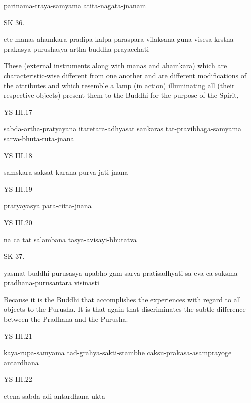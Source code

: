 parinama-traya-samyama atita-nagata-jnanam

SK 36.

ete manas ahamkara pradipa-kalpa paraspara vilaksana
guna-visesa krstna prakasya purushasya-artha buddha prayacchati

These (external instruments along with manas and ahamkara)
which are characteristic-wise different from one another
and are different modifications of the attributes
and which resemble a lamp (in action)
illuminating all (their respective objects)
present them to the Buddhi for the purpose of the Spirit,

YS III.17

sabda-artha-pratyayana itaretara-adhyasat sankaras
tat-pravibhaga-samyama sarva-bhuta-ruta-jnana

YS III.18

samskara-saksat-karana purva-jati-jnana

YS III.19

pratyayasya para-citta-jnana

YS III.20

na ca tat salambana tasya-avisayi-bhutatva

SK 37.

yasmat buddhi purusasya upabho-gam sarva pratisadhyati
sa eva ca suksma pradhana-purusantara visinasti

Because it is the Buddhi that accomplishes the experiences
with regard to all objects to the Purusha.
It is that again that discriminates the subtle difference
between the Pradhana and the Purusha.

YS III.21

kaya-rupa-samyama tad-grahya-sakti-stambhe
caksu-prakasa-asamprayoge antardhana

YS III.22

etena sabda-adi-antardhana ukta
